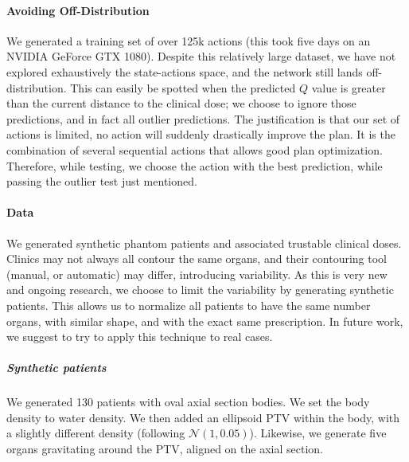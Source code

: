 \paragraph{Avoiding Off-Distribution}
We generated a training set of over 125k actions (this took five days on an NVIDIA GeForce GTX 1080).
Despite this relatively large dataset, we have not explored exhaustively the state-actions space, and the network still lands off-distribution.
This can easily be spotted when the predicted $Q$ value is greater than the current distance to the clinical dose; we choose to ignore those predictions, and in fact all outlier predictions.
The justification is that our set of actions is limited, no action will suddenly drastically improve the plan.
It is the combination of several sequential actions that allows good plan optimization.
Therefore, while testing, we choose the action with the best prediction, while passing the outlier test just mentioned.

\paragraph{Data}
We generated synthetic phantom patients and associated trustable clinical doses.
Clinics may not always all contour the same organs, and their contouring tool (manual, or automatic) may differ, introducing variability.
As this is very new and ongoing research, we choose to limit the variability by generating synthetic patients.
This allows us to normalize all patients to have the same number organs, with similar shape, and with the exact same prescription.
In future work, we suggest to try to apply this technique to real cases.

\subparagraph{Synthetic patients}
We generated 130 patients with oval axial section bodies.
We set the body density to water density.
We then added an ellipsoid PTV within the body, with a slightly different density (following $\mathcal{N}(1,0.05)$).
Likewise, we generate five organs gravitating around the PTV, aligned on the axial section.

